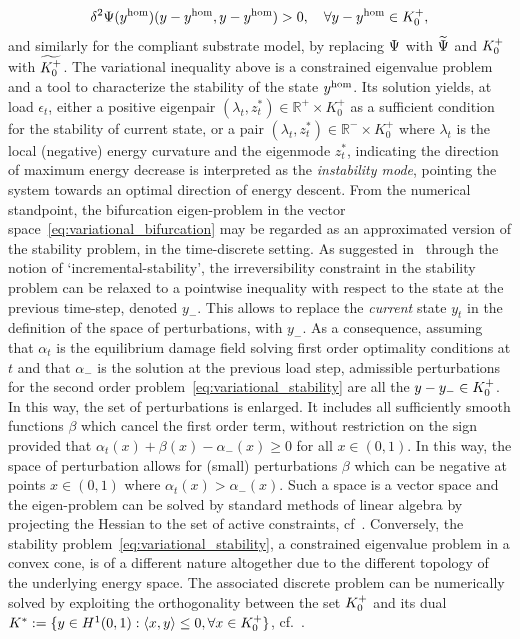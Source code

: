 \documentclass[10pt]{article}
\begin{document}
%
%
\begin{equation}
     \label{eq:variational_stability}
     \delta^2 \Psi(y^{\text{hom}})(y - y^{\text{hom}},  y - y^{\text{hom}})  > 0, \quad \forall y-y^{\text{hom}} \in K^+_{0},
 \end{equation}
and similarly for the compliant substrate model, by replacing $\Psi$ with $\widetilde\Psi$ and $K^+_{0}$ with $\widetilde{K^+_{0}}$.
The variational inequality above is a constrained eigenvalue problem and a tool to characterize the stability of the state $y^{\text{hom}}$. Its solution yields, at load $\epsilon_t$, either a positive eigenpair $(\lambda_t, z^*_t)\in \mathbb{R}^+\times K^+_0$ as a sufficient condition for the stability of current state, or a pair $(\lambda_t, z^*_t)\in \mathbb{R}^-\times K^+_0$ where $\lambda_t$ is the local (negative) energy curvature and the eigenmode $z^*_t$, indicating the direction of maximum energy decrease is interpreted as the \emph{instability mode}, pointing the system towards an optimal direction of energy descent. 
From the numerical standpoint, the bifurcation eigen-problem in the vector space~\eqref{eq:variational_bifurcation} may be regarded as an approximated version of the stability problem, in the time-discrete setting. As suggested in~\cite{Baldelli2021-gc} through the notion of `incremental-stability', the irreversibility constraint in the stability problem can be relaxed to a pointwise inequality with respect to the state at the previous time-step, denoted $y_-$.
This allows to replace the \emph{current} state $y_t$ in the definition of the space of perturbations, with $y_-$. As a consequence, assuming that $\alpha_t$ is the equilibrium damage field solving first order optimality conditions at $t$ and that $\alpha_-$ is the solution at the previous load step, admissible perturbations for the second order problem~\eqref{eq:variational_stability} are all the $y-y_-\in K^+_{0}$. In this way, the set of perturbations is enlarged. It includes all sufficiently smooth functions $\beta$ which cancel the first order term, without restriction on the sign provided that $\alpha_t(x) + \beta(x) - \alpha_-(x)\geq 0$ for all $x\in (0, 1)$.
%
%
In this way, the space of perturbation allows for (small) perturbations $\beta$ which can be negative at points $x\in(0,1)$ where $\alpha_t(x)>\alpha_-(x)$. Such a space is a vector space and the eigen-problem can be solved by standard methods of linear algebra by projecting the Hessian to the set of active constraints, cf~\cite{Nocedal1999-zr}.
Conversely, the stability problem~\eqref{eq:variational_stability}, a constrained eigenvalue problem in a convex cone, is of a different nature altogether due to the different topology of the underlying energy space. 
The associated discrete problem can be numerically solved by exploiting the orthogonality between the set $K^+_{0}$ and its dual $K^*:=\{y \in H^1(0,1): \langle x,y \rangle \leq 0, \forall x \in K^+_{0}\}$, cf.~\cite{Moreau1962-fz,Pinto_da_Costa2010-qv}.
\end{document}
